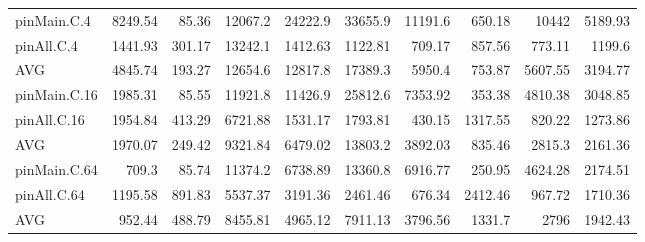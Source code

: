 \begin{table*}[]
\begin{center}
\begin{tabular}{lrrrrrrrrr}
 pinMain.C.4  & 8249.54 &   85.36 & 12067.2 & 24222.9 & 33655.9 & 11191.6 &  650.18 &   10442 & 5189.93 \\
 pinAll.C.4   & 1441.93 &  301.17 & 13242.1 & 1412.63 & 1122.81 &  709.17 &  857.56 &  773.11 &  1199.6 \\
 AVG          & 4845.74 &  193.27 & 12654.6 & 12817.8 & 17389.3 &  5950.4 &  753.87 & 5607.55 & 3194.77 \\
 pinMain.C.16 & 1985.31 &   85.55 & 11921.8 & 11426.9 & 25812.6 & 7353.92 &  353.38 & 4810.38 & 3048.85 \\
 pinAll.C.16  & 1954.84 &  413.29 & 6721.88 & 1531.17 & 1793.81 &  430.15 & 1317.55 &  820.22 & 1273.86 \\
 AVG          & 1970.07 &  249.42 & 9321.84 & 6479.02 & 13803.2 & 3892.03 &  835.46 &  2815.3 & 2161.36 \\
 pinMain.C.64 &   709.3 &   85.74 & 11374.2 & 6738.89 & 13360.8 & 6916.77 &  250.95 & 4624.28 & 2174.51 \\
 pinAll.C.64  & 1195.58 &  891.83 & 5537.37 & 3191.36 & 2461.46 &  676.34 & 2412.46 &  967.72 & 1710.36 \\
 AVG          &  952.44 &  488.79 & 8455.81 & 4965.12 & 7911.13 & 3796.56 &  1331.7 &    2796 & 1942.43 \\
\hline
\end{tabular}
\end{center}
\end{table*}

